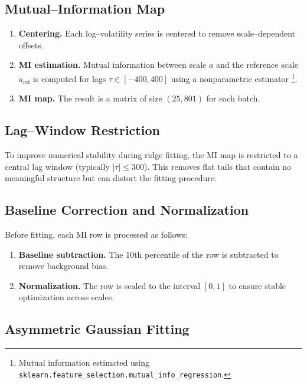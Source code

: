 \documentclass[pdflatex,sn-mathphys-num]{sn-jnl}%
\theoremstyle{thmstyleone}%
\theoremstyle{thmstyletwo}%
\theoremstyle{thmstylethree}%
\begin{document}
\subsection{Mutual–Information Map}
\begin{enumerate}
    \item \textbf{Centering.}  
   Each log–volatility series is centered to remove scale–dependent offsets.
   \item \textbf{MI estimation.}  
   Mutual information between scale $a$ and the reference scale
   $a_{\mathrm{ref}}$ is computed for lags $\tau \in [-400,400]$ using a
   nonparametric estimator%
   \footnote{Mutual information estimated using \texttt{sklearn.feature\_selection.mutual\_info\_regression}.}.
   \item \textbf{MI map.}  
   The result is a matrix of size $(25,801)$ for each batch.
\end{enumerate}


\subsection{Lag–Window Restriction}

To improve numerical stability during ridge fitting, the MI map is restricted
to a central lag window (typically $|\tau| \le 300$).  
This removes flat tails that contain no meaningful structure but can distort
the fitting procedure.

\subsection{Baseline Correction and Normalization}

Before fitting, each MI row is processed as follows:
\begin{enumerate}
    \item \textbf{Baseline subtraction.}  
   The 10th percentile of the row is subtracted to remove background bias.
   \item \textbf{Normalization.}  
   The row is scaled to the interval $[0,1]$ to ensure stable optimization
   across scales.
\end{enumerate}

\subsection{Asymmetric Gaussian Fitting}
\end{document}
